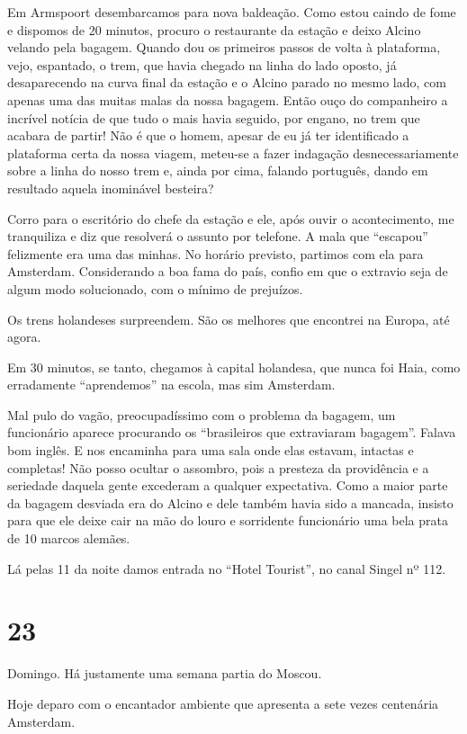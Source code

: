 Em Armspoort desembarcamos para nova baldeação. Como estou caindo de fome e dispomos de 20 minutos, procuro o restaurante da estação e deixo Alcino velando pela bagagem. Quando dou os primeiros passos de volta à plataforma, vejo, espantado, o trem, que havia chegado na linha do lado oposto, já desaparecendo na curva final da estação e o Alcino parado no mesmo lado, com apenas uma das muitas malas da nossa bagagem. Então ouço do companheiro a incrível notícia de que tudo o mais havia seguido, por engano, no trem que acabara de partir! Não é que o homem, apesar de eu já ter identificado a plataforma certa da nossa viagem, meteu-se a fazer indagação desnecessariamente sobre a linha do nosso trem e, ainda por cima, falando português, dando em resultado aquela inominável besteira?

Corro para o escritório do chefe da estação e ele, após ouvir o acontecimento, me tranquiliza e diz que resolverá o assunto por telefone. A mala que “escapou” felizmente era uma das minhas. No horário previsto, partimos com ela para Amsterdam. Considerando a boa fama do país, confio em que o extravio seja de algum modo solucionado, com o mínimo de prejuízos.

Os trens holandeses surpreendem. São os melhores que encontrei na Europa, até agora.

Em 30 minutos, se tanto, chegamos à capital holandesa, que nunca foi Haia, como erradamente “aprendemos” na escola, mas sim Amsterdam.

Mal pulo do vagão, preocupadíssimo com o problema da bagagem, um funcionário aparece procurando os “brasileiros que extraviaram bagagem”. Falava bom inglês. E nos encaminha para uma sala onde elas estavam, intactas e completas! Não posso ocultar o assombro, pois a presteza da providência e a seriedade daquela gente excederam a qualquer expectativa. Como a maior parte da bagagem desviada era do Alcino e dele também havia sido a mancada, insisto para que ele deixe cair na mão do louro e sorridente funcionário uma bela prata de 10 marcos alemães.

Lá pelas 11 da noite damos entrada no “Hotel Tourist”, no canal Singel nº 112.

\section*{23 \adfflatleafright {}}
Domingo. Há justamente uma semana partia do Moscou.

Hoje deparo com o encantador ambiente que apresenta a sete vezes centenária Amsterdam.

